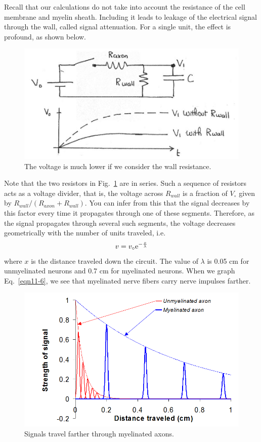 Recall that our calculations do not take into account the resistance of the cell membrane and myelin sheath.  Including it leads to leakage of the electrical signal through the wall, called signal attenuation.  For a single unit, the effect is profound, as shown below.  
\begin{figure}[!htb]
	\centering
	\includegraphics[width=4.5in]{./figures/Topic11/Fig11-14.jpg}
	\caption{The voltage is much lower if we consider the wall resistance.}
	\label{Fig11-14}
\end{figure} 
Note that the two resistors in Fig.~\ref{Fig11-14} are in series. Such a sequence of resistors acts as a voltage divider, that is, the voltage across $R_{wall}$ is a fraction of $V_{\circ}$ given by $R_{wall}/\left(R_{axon}+R_{wall}\right)$. You can infer from this that the signal decreases by this factor every time it propagates through one of these segments. Therefore, as the signal propagates through several such segments, the voltage decreases geometrically with the number of units traveled, i.e.  
\begin{equation}\label{eqn11-6}
v=v_{\circ}{\rm e}^{-\frac{x}{\lambda}}
\end{equation}
where $x$ is the distance traveled down the circuit.  The value of $\lambda$ is 0.05 cm for unmyelinated neurons and 0.7 cm for myelinated neurons.  When we graph Eq.~\ref{eqn11-6}, we see that myelinated nerve fibers carry nerve impulses farther.
\begin{figure}[!htb]
	\centering
	\includegraphics[width=4.5in]{./figures/Topic11/Fig11-15.png}
	\caption{Signals travel farther through myelinated axons.}
	\label{Fig11-15}
\end{figure} 


